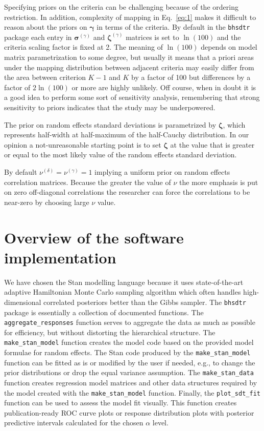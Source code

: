 \documentclass[oneside,a4paper]{article}
\begin{document}
Specifying priors on the criteria can be challenging because of the
ordering restriction. In addition, complexity of mapping in
Eq.~\ref{eq:1} makes it difficult to reason about the priors on
$\bm{\gamma}$ in terms of the criteria. By default in the
\texttt{bhsdtr} package each entry in $\bm{\sigma}^{(\gamma)}$ and
$\bm{\zeta}^{(\gamma)}$ matrices is set to $\ln(100)$ and the criteria
scaling factor is fixed at 2. The meaning of $\ln(100)$ depends on
model matrix parametrization to some degree, but usually it means that
a priori areas under the mapping distribution between adjacent
criteria may easily differ from the area between criterion $K-1$ and
$K$ by a factor of 100 but differences by a factor of $2 \ln(100)$ or
more are highly unlikely. Off course, when in doubt it is a good idea
to perform some sort of sensitivity analysis, remembering that strong
sensitivity to priors indicates that the study may be underpowered.

The prior on random effects standard deviations is parametrized by
$\bm{\zeta}$, which represents half-width at half-maximum of the
half-Cauchy distribution. In our opinion a not-unreasonable starting
point is to set $\bm{\zeta}$ at the value that is greater or equal to
the most likely value of the random effects standard deviation.

By default $\nu^{(\delta)} = \nu^{(\gamma)} = 1$ implying a uniform
prior on random effects correlation matrices. Because the greater the
value of $\nu$ the more emphasis is put on zero off-diagonal
correlations the researcher can force the correlations to be near-zero
by choosing large $\nu$ value.

\section{Overview of the software implementation}

We have chosen the Stan modelling language \cite{carpenter2016stan}
because it uses state-of-the-art adaptive Hamiltonian Monte Carlo
sampling algorithm which often handles high-dimensional correlated
posteriors better than the Gibbs sampler. The \texttt{bhsdtr} package
is essentially a collection of documented functions. The
\texttt{aggregate\_responses} function serves to aggregate the data as
much as possible for efficiency, but without distorting the
hierarchical structure. The \texttt{make\_stan\_model} function
creates the model code based on the provided model formulae for random
effects. The Stan code produced by the \texttt{make\_stan\_model}
function can be fitted as is or modified by the user if needed, e.g.,
to change the prior distributions or drop the equal variance
assumption. The \texttt{make\_stan\_data} function creates regression
model matrices and other data structures required by the model created
with the \texttt{make\_stan\_model} function. Finally, the
\texttt{plot\_sdt\_fit} function can be used to assess the model fit
visually. This function creates publication-ready ROC curve plots or
response distribution plots with posterior predictive intervals
calculated for the chosen $\alpha$ level.
\end{document}
